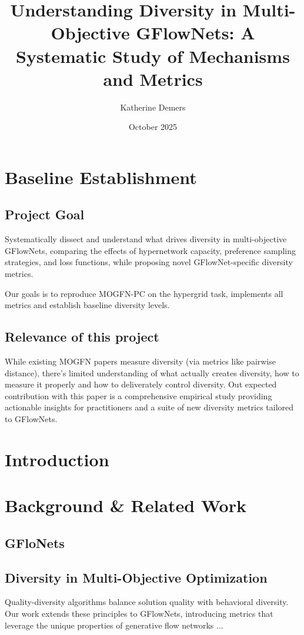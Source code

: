 \documentclass[10pts]{article}
\title{Understanding Diversity in Multi-Objective GFlowNets: A Systematic Study of Mechanisms and Metrics}
\author{Katherine Demers}
\date{October 2025}
\begin{document}
\maketitle
\section{Baseline Establishment}
\subsection{Project Goal}
Systematically dissect and understand what drives diversity in multi-objective GFlowNets,
comparing the effects of hypernetwork capacity, preference sampling strategies, and loss functions, while proposing novel GFlowNet-specific diversity metrics.

Our goals is to reproduce MOGFN-PC on the hypergrid task, implements all metrics and establish baseline diversity levels.

\subsection{Relevance of this project}
While existing MOGFN papers measure diversity (via metrics like pairwise distance),
there's limited understanding of what actually creates diversity, how to measure it properly and how to deliverately control diversity. Out expected contribution with this paper is a comprehensive empirical study providing actionable insights for practitioners and a suite of new diversity metrics tailored to GFlowNets.

\section{Introduction}

\section{Background \& Related Work}
\subsection{GFloNets}

\subsection{Diversity in Multi-Objective Optimization}
Quality-diversity algorithms \citep{pugh2016quality, 7959075} balance 
solution quality with behavioral diversity. Our work extends these principles 
to GFlowNets, introducing metrics that leverage the unique properties of 
generative flow networks \citep{bengio2021flow}...
\end{document}
